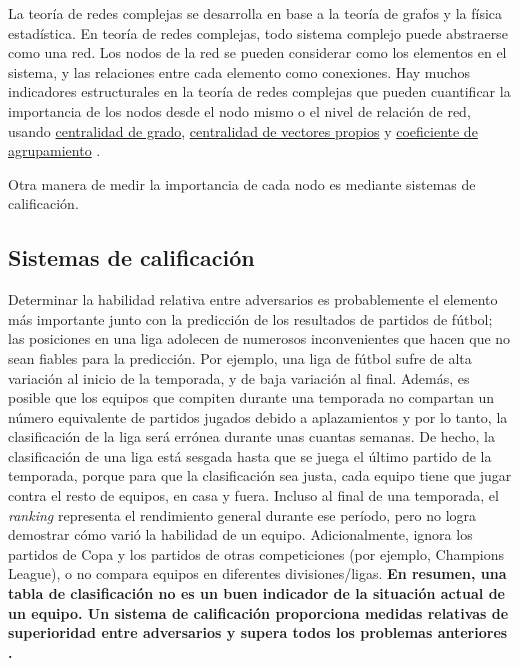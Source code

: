 La teoría de redes complejas se desarrolla en base a la teoría de grafos y la física estadística. En teoría de 
redes complejas, todo sistema complejo puede abstraerse como una red. Los nodos de la red se pueden 
considerar como los elementos en el sistema, y las relaciones
entre cada elemento como conexiones. Hay muchos indicadores estructurales
en la teoría de redes complejas que pueden cuantificar la importancia de los nodos desde el nodo mismo o el
nivel de relación de red, usando \href{https://link.springer.com/10.1007%2F978-1-4419-9863-7_935}{centralidad de grado}, 
\href{https://neo4j.com/docs/graph-data-science/current/algorithms/eigenvector-centrality/}{centralidad de vectores propios} 
y \href{https://en.wikipedia.org/wiki/Clustering_coefficient}{coeficiente de agrupamiento} \cite{albert2002statistical}.
 


Otra manera de medir la importancia de cada nodo es mediante sistemas de calificación.

\subsection{Sistemas de calificación} \label{subsect:ratings}
Determinar la habilidad relativa entre adversarios es probablemente el
elemento más importante junto con la predicción de los resultados de partidos de fútbol; las posiciones en 
una liga adolecen de numerosos inconvenientes que hacen que no sean fiables para la predicción. 
Por ejemplo, una liga de fútbol sufre de alta variación al inicio de la temporada, y de baja 
variación al final. Además, es posible que los equipos que compiten durante una temporada no
compartan un número equivalente de partidos jugados debido a aplazamientos y
por lo tanto, la clasificación de la liga será errónea durante unas cuantas semanas. De hecho, 
la clasificación de una liga está sesgada hasta que se juega el último partido de la temporada, porque
para que la clasificación sea justa, cada equipo tiene que jugar contra el resto de equipos, en
casa y fuera. Incluso al final de una temporada, el \textit{ranking} representa
el rendimiento general durante ese período, pero no logra
demostrar cómo varió la habilidad de un equipo. Adicionalmente,
ignora los partidos de Copa y los partidos de otras competiciones (por ejemplo, Champions
League), o no compara equipos en diferentes divisiones/ligas. \textbf{En
resumen, una tabla de clasificación no es un buen indicador de la situación actual de un equipo. Un 
sistema de calificación proporciona medidas relativas de superioridad entre adversarios y supera 
todos los problemas anteriores \cite{pi-ratings}.}

